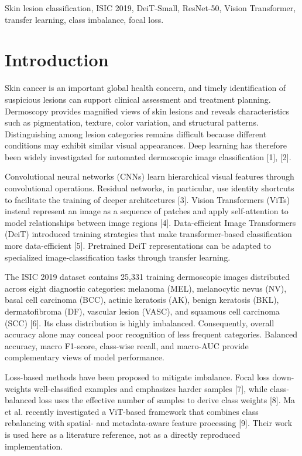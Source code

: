\documentclass[conference]{IEEEtran}
\begin{document}
\begin{IEEEkeywords}
Skin lesion classification, ISIC 2019, DeiT-Small, ResNet-50, Vision Transformer, transfer learning, class imbalance, focal loss.
\end{IEEEkeywords}

\section{Introduction}
Skin cancer is an important global health concern, and timely identification of suspicious lesions can support clinical assessment and treatment planning. Dermoscopy provides magnified views of skin lesions and reveals characteristics such as pigmentation, texture, color variation, and structural patterns. Distinguishing among lesion categories remains difficult because different conditions may exhibit similar visual appearances. Deep learning has therefore been widely investigated for automated dermoscopic image classification [1], [2].

Convolutional neural networks (CNNs) learn hierarchical visual features through convolutional operations. Residual networks, in particular, use identity shortcuts to facilitate the training of deeper architectures [3]. Vision Transformers (ViTs) instead represent an image as a sequence of patches and apply self-attention to model relationships between image regions [4]. Data-efficient Image Transformers (DeiT) introduced training strategies that make transformer-based classification more data-efficient [5]. Pretrained DeiT representations can be adapted to specialized image-classification tasks through transfer learning.

The ISIC 2019 dataset contains 25,331 training dermoscopic images distributed across eight diagnostic categories: melanoma (MEL), melanocytic nevus (NV), basal cell carcinoma (BCC), actinic keratosis (AK), benign keratosis (BKL), dermatofibroma (DF), vascular lesion (VASC), and squamous cell carcinoma (SCC) [6]. Its class distribution is highly imbalanced. Consequently, overall accuracy alone may conceal poor recognition of less frequent categories. Balanced accuracy, macro F1-score, class-wise recall, and macro-AUC provide complementary views of model performance.

Loss-based methods have been proposed to mitigate imbalance. Focal loss down-weights well-classified examples and emphasizes harder samples [7], while class-balanced loss uses the effective number of samples to derive class weights [8]. Ma et al. recently investigated a ViT-based framework that combines class rebalancing with spatial- and metadata-aware feature processing [9]. Their work is used here as a literature reference, not as a directly reproduced implementation.
\end{document}
